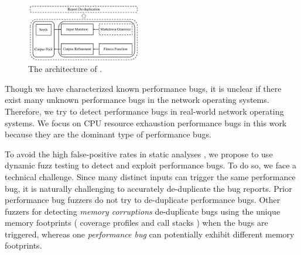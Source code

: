 \section{\sys}
\label{s:method}
\begin{figure}[t]
    \centering
    \includegraphics[width=0.45\textwidth]{fig/ase-parser-dos.pdf}
    \caption{The architecture of \sys.
    }
    \label{fig:arch}
\end{figure}

Though we have characterized known performance bugs, %
%
it is unclear if there exist many unknown performance bugs in the network operating systems.
%
Therefore, we try to detect performance bugs in real-world network operating systems.
%
We focus on CPU resource exhaustion performance bugs in this work because they are the dominant type of performance bugs.
%
%

To avoid the high false-positive rates in static analyses \cite{nistor2013toddler,nistor2015caramel},
%
we propose to use dynamic fuzz testing to detect and exploit performance bugs.
%
%
%
%
To do so, we face a technical challenge.
%
Since many distinct inputs can trigger the same performance bug, it is naturally challenging to accurately de-duplicate the bug reports.
%
Prior performance bug fuzzers \cite{slowfuzz, hotfuzz} do not try to de-duplicate performance bugs.
%
Other fuzzers for detecting \emph{memory corruptions} de-duplicate bugs using the unique memory footprints (\eg{,} coverage profiles and call stacks \cite{klees2018evaluating}) when the bugs are triggered,
%
whereas one \emph{performance bug} can potentially exhibit different memory footprints.
%
%

